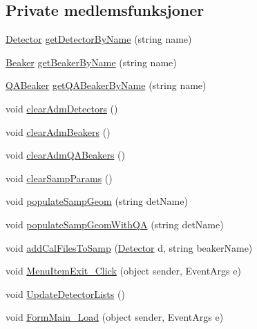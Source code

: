 \subsection*{Private medlemsfunksjoner}
\begin{DoxyCompactItemize}
\item 
\hyperlink{class_scintilab_1_1_detector}{Detector} \hyperlink{class_scintilab_1_1_form_main_aff4482e0919480013a53fe56cfb374ba}{get\+Detector\+By\+Name} (string name)
\item 
\hyperlink{class_scintilab_1_1_beaker}{Beaker} \hyperlink{class_scintilab_1_1_form_main_a28d6ae4e27996e005e989b7256a45460}{get\+Beaker\+By\+Name} (string name)
\item 
\hyperlink{class_scintilab_1_1_q_a_beaker}{Q\+A\+Beaker} \hyperlink{class_scintilab_1_1_form_main_ae8b1f6bb6a734ec6ad54794d345ce650}{get\+Q\+A\+Beaker\+By\+Name} (string name)
\item 
void \hyperlink{class_scintilab_1_1_form_main_a79453298b8521054e8012d9df6fe6b93}{clear\+Adm\+Detectors} ()
\item 
void \hyperlink{class_scintilab_1_1_form_main_af1716116c6d9b7a6900fb3ac10b7cf26}{clear\+Adm\+Beakers} ()
\item 
void \hyperlink{class_scintilab_1_1_form_main_a94e0c785ff92478f3bb21311a6bdf50f}{clear\+Adm\+Q\+A\+Beakers} ()
\item 
void \hyperlink{class_scintilab_1_1_form_main_a01c213a0d1456773b92d4d431a9d1cdb}{clear\+Samp\+Params} ()
\item 
void \hyperlink{class_scintilab_1_1_form_main_ace8f1fb51afa44804deec60a6dc42bcb}{populate\+Samp\+Geom} (string det\+Name)
\item 
void \hyperlink{class_scintilab_1_1_form_main_a2d2ec0fa77e4dd0a81bb186b8021b210}{populate\+Samp\+Geom\+With\+Q\+A} (string det\+Name)
\item 
void \hyperlink{class_scintilab_1_1_form_main_ab744904cac6a4bf90ebbe326b658e2e5}{add\+Cal\+Files\+To\+Samp} (\hyperlink{class_scintilab_1_1_detector}{Detector} d, string beaker\+Name)
\item 
void \hyperlink{class_scintilab_1_1_form_main_a14289005c3867f1744618030dc33d79c}{Menu\+Item\+Exit\+\_\+\+Click} (object sender, Event\+Args e)
\item 
void \hyperlink{class_scintilab_1_1_form_main_a7919f1d4c3819a3c85df4107bbf82a59}{Update\+Detector\+Lists} ()
\item 
void \hyperlink{class_scintilab_1_1_form_main_a6c96beb015193d225dd65035759f8484}{Form\+Main\+\_\+\+Load} (object sender, Event\+Args e)

\end{DoxyCompactItemize}
